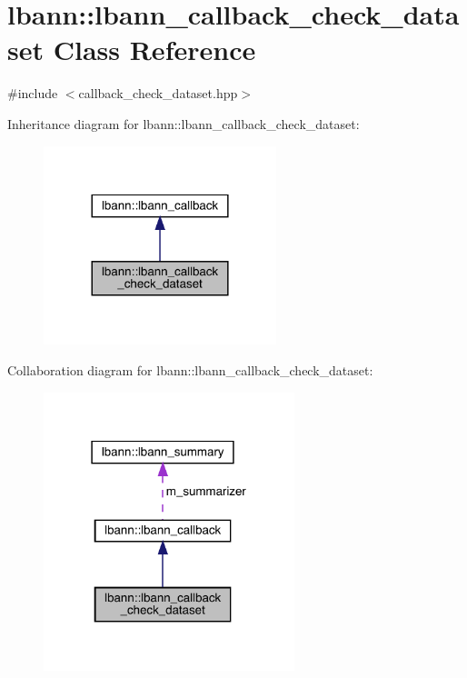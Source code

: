 \hypertarget{classlbann_1_1lbann__callback__check__dataset}{}\section{lbann\+:\+:lbann\+\_\+callback\+\_\+check\+\_\+dataset Class Reference}
\label{classlbann_1_1lbann__callback__check__dataset}


{\ttfamily \#include $<$callback\+\_\+check\+\_\+dataset.\+hpp$>$}



Inheritance diagram for lbann\+:\+:lbann\+\_\+callback\+\_\+check\+\_\+dataset\+:\nopagebreak
\begin{figure}[H]
\begin{center}
\leavevmode
\includegraphics[width=192pt]{classlbann_1_1lbann__callback__check__dataset__inherit__graph}
\end{center}
\end{figure}


Collaboration diagram for lbann\+:\+:lbann\+\_\+callback\+\_\+check\+\_\+dataset\+:\nopagebreak
\begin{figure}[H]
\begin{center}
\leavevmode
\includegraphics[width=207pt]{classlbann_1_1lbann__callback__check__dataset__coll__graph}
\end{center}
\end{figure}
